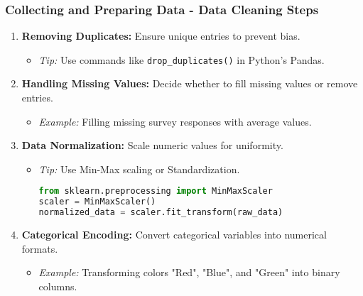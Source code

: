\documentclass[aspectratio=169]{beamer}
\begin{document}
\begin{frame}[fragile]
    \frametitle{Collecting and Preparing Data - Data Cleaning Steps}
    \begin{enumerate}
        \item \textbf{Removing Duplicates:} Ensure unique entries to prevent bias.
        \begin{itemize}
            \item \textit{Tip:} Use commands like \texttt{drop\_duplicates()} in Python’s Pandas.
        \end{itemize}

        \item \textbf{Handling Missing Values:} Decide whether to fill missing values or remove entries.
        \begin{itemize}
            \item \textit{Example:} Filling missing survey responses with average values.
        \end{itemize}

        \item \textbf{Data Normalization:} Scale numeric values for uniformity.
        \begin{itemize}
            \item \textit{Tip:} Use Min-Max scaling or Standardization.
            \begin{lstlisting}[language=Python]
from sklearn.preprocessing import MinMaxScaler
scaler = MinMaxScaler()
normalized_data = scaler.fit_transform(raw_data)
            \end{lstlisting}
        \end{itemize}

        \item \textbf{Categorical Encoding:} Convert categorical variables into numerical formats.
        \begin{itemize}
            \item \textit{Example:} Transforming colors "Red", "Blue", and "Green" into binary columns.
        \end{itemize}
    \end{enumerate}
\end{frame}
\end{document}
